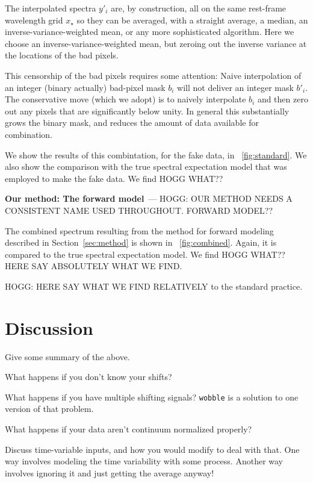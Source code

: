 \documentclass[11pt]{article}
\renewcommand{\paragraph}[1]{\medskip\par\noindent\textbf{#1}~---}
\newcommand{\sectionname}{Section}
\begin{document}
The interpolated spectra $y'_i$ are, by construction, all on the same rest-frame wavelength grid $x_\star$ so they can be averaged, with a straight average, a median, an inverse-variance-weighted mean, or any more sophisticated algorithm.
Here we choose an inverse-variance-weighted mean, but zeroing out the inverse variance at the locations of the bad pixels.

This censorship of the bad pixels requires some attention:
Naive interpolation of an integer (binary actually) bad-pixel mask $b_i$ will not deliver an integer mask $b'_i$.
The conservative move (which we adopt) is to naively interpolate $b_i$ and then zero out any pixels that are significantly below unity.
In general this substantially grows the binary mask, and reduces the amount of data available for combination.

We show the results of this combintation, for the fake data, in \figurename~\ref{fig:standard}.
We also show the comparison with the true spectral expectation model that was employed to make the fake data.
We find HOGG WHAT??

\paragraph{Our method: The forward model}
HOGG: OUR METHOD NEEDS A CONSISTENT NAME USED THROUGHOUT. FORWARD MODEL??

The combined spectrum resulting from the method for forward modeling described in \sectionname~\ref{sec:method} is shown in \figurename~\ref{fig:combined}.
Again, it is compared to the true spectral expectation model.
We find HOGG WHAT?? HERE SAY ABSOLUTELY WHAT WE FIND.

HOGG: HERE SAY WHAT WE FIND RELATIVELY to the standard practice.

\section{Discussion}

Give some summary of the above.

What happens if you don't know your shifts?

What happens if you have multiple shifting signals?
\texttt{wobble} \cite{wobble} is a solution to one version of that problem.

What happens if your data aren't continuum normalized properly?

Discuss time-variable inputs, and how you would modify to deal with that.
One way involves modeling the time variability with some process.
Another way involves ignoring it and just getting the average anyway!
\end{document}
